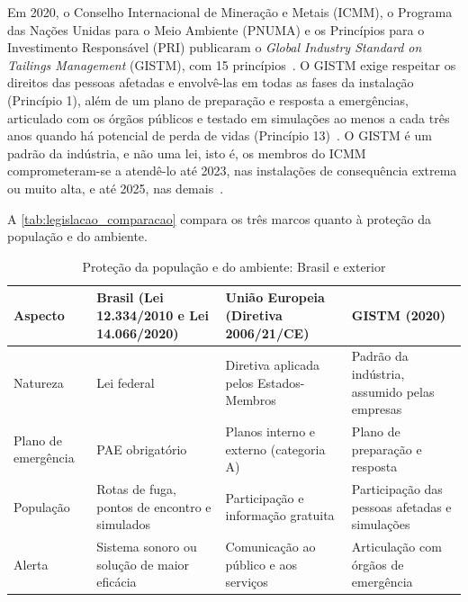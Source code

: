 Em 2020, o Conselho Internacional de Mineração e Metais (ICMM), o
Programa das Nações Unidas para o Meio Ambiente (PNUMA) e os Princípios
para o Investimento Responsável (PRI) publicaram o \textit{Global
Industry Standard on Tailings Management} (GISTM), com 15 princípios~\cite{icmm2020global}.
O GISTM exige respeitar os direitos das pessoas afetadas e envolvê-las
em todas as fases da instalação (Princípio 1), além de um plano de
preparação e resposta a emergências, articulado com os órgãos públicos
e testado em simulações ao menos a cada três anos quando há potencial de
perda de vidas (Princípio 13)~\cite[p.~7 e 21]{icmm2020global}.
O GISTM é um padrão da indústria, e não uma lei, isto é, os membros do ICMM
comprometeram-se a atendê-lo até 2023, nas instalações de consequência
extrema ou muito alta, e até 2025, nas demais~\cite{icmm2025gistm}.

A \autoref{tab:legislacao_comparacao} compara os três marcos quanto à
proteção da população e do ambiente.

\begin{table}[H]
\centering
\caption{Proteção da população e do ambiente: Brasil e exterior}
\label{tab:legislacao_comparacao}
\small
\begin{tabular}{|p{2.1cm}|p{4.2cm}|p{3.6cm}|p{3.6cm}|}
\hline
\textbf{Aspecto} & \textbf{Brasil (Lei 12.334/2010 e Lei 14.066/2020)} & \textbf{União Europeia (Diretiva 2006/21/CE)} & \textbf{GISTM (2020)} \\
\hline
Natureza & Lei federal & Diretiva aplicada pelos Estados-Membros & Padrão da indústria, assumido pelas empresas \\
\hline
Plano de emergência & PAE obrigatório & Planos interno e externo (categoria A) & Plano de preparação e resposta \\
\hline
População & Rotas de fuga, pontos de encontro e simulados & Participação e informação gratuita & Participação das pessoas afetadas e simulações \\
\hline
Alerta & Sistema sonoro ou solução de maior eficácia & Comunicação ao público e aos serviços & Articulação com órgãos de emergência \\
\hline
\end{tabular}
\end{table}

